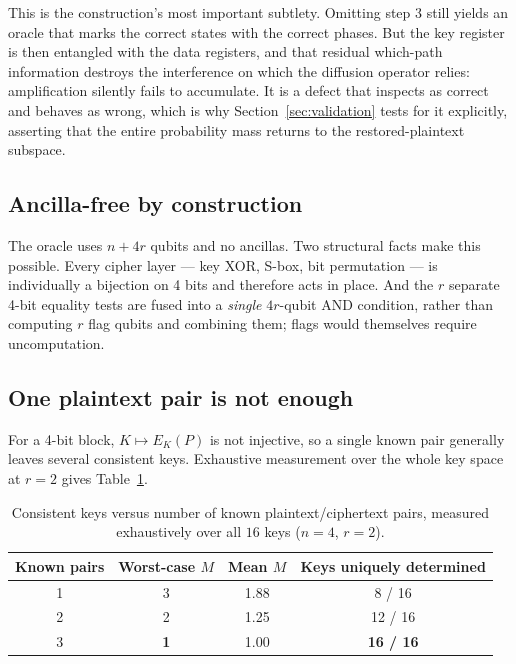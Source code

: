 \documentclass[11pt,a4paper]{article}
\newcommand{\Ek}{E_K}
\begin{document}
This is the construction's most important subtlety. Omitting step 3 still
yields an oracle that marks the correct states with the correct phases. But the
key register is then entangled with the data registers, and that residual
which-path information destroys the interference on which the diffusion
operator relies: amplification silently fails to accumulate. It is a defect
that inspects as correct and behaves as wrong, which is why
Section~\ref{sec:validation} tests for it explicitly, asserting that the
entire probability mass returns to the restored-plaintext subspace.

\subsection{Ancilla-free by construction}

The oracle uses $n + 4r$ qubits and no ancillas. Two structural facts make this
possible. Every cipher layer --- key XOR, S-box, bit permutation --- is
individually a bijection on 4 bits and therefore acts in place. And the $r$
separate 4-bit equality tests are fused into a \emph{single} $4r$-qubit AND
condition, rather than computing $r$ flag qubits and combining them; flags would
themselves require uncomputation.

\subsection{One plaintext pair is not enough}
\label{sec:pairs}

For a 4-bit block, $K \mapsto \Ek(P)$ is not injective, so a single known pair
generally leaves several consistent keys. Exhaustive measurement over the whole
key space at $r = 2$ gives Table~\ref{tab:pairs}.

\begin{table}[htbp]
  \centering
  \caption{Consistent keys versus number of known plaintext/ciphertext pairs,
           measured exhaustively over all $16$ keys ($n=4$, $r=2$).}
  \label{tab:pairs}
  \begin{tabular}{cccc}
    \toprule
    Known pairs & Worst-case $M$ & Mean $M$ & Keys uniquely determined \\
    \midrule
    1 & 3 & 1.88 & 8 / 16 \\
    2 & 2 & 1.25 & 12 / 16 \\
    3 & \textbf{1} & 1.00 & \textbf{16 / 16} \\
    \bottomrule
  \end{tabular}
\end{table}
\end{document}
